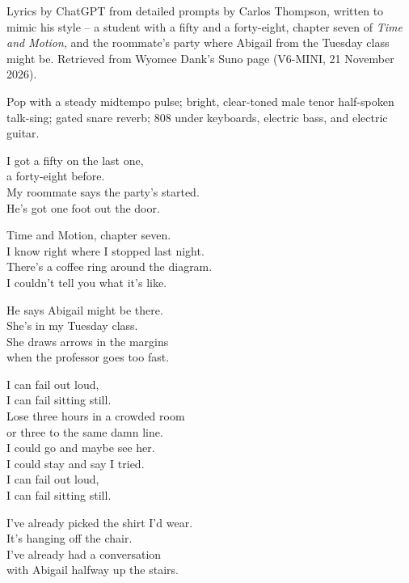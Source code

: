 
\begin{notes}
Lyrics by ChatGPT from detailed prompts by Carlos Thompson, written to mimic his style -- a student with a fifty and a forty-eight, chapter seven of \emph{Time and Motion}, and the roommate's party where Abigail from the Tuesday class might be. Retrieved from Wyomee Dank's Suno page (V6-MINI, 21 November 2026).
\end{notes}
\begin{style}
Pop with a steady midtempo pulse; bright, clear-toned male tenor half-spoken talk-sing; gated snare reverb; 808 under keyboards, electric bass, and electric guitar.
\end{style}
\begin{lyrics}
I got a fifty on the last one,\\
a forty-eight before.\\
My roommate says the party’s started.\\
He’s got one foot out the door.

Time and Motion, chapter seven.\\
I know right where I stopped last night.\\
There’s a coffee ring around the diagram.\\
I couldn’t tell you what it’s like.

He says Abigail might be there.\\
She’s in my Tuesday class.\\
She draws arrows in the margins\\
when the professor goes too fast.

I can fail out loud,\\
I can fail sitting still.\\
Lose three hours in a crowded room\\
or three to the same damn line.\\
I could go and maybe see her.\\
I could stay and say I tried.\\
I can fail out loud,\\
I can fail sitting still.

I’ve already picked the shirt I’d wear.\\
It’s hanging off the chair.\\
I’ve already had a conversation\\
with Abigail halfway up the stairs.


\end{lyrics}
